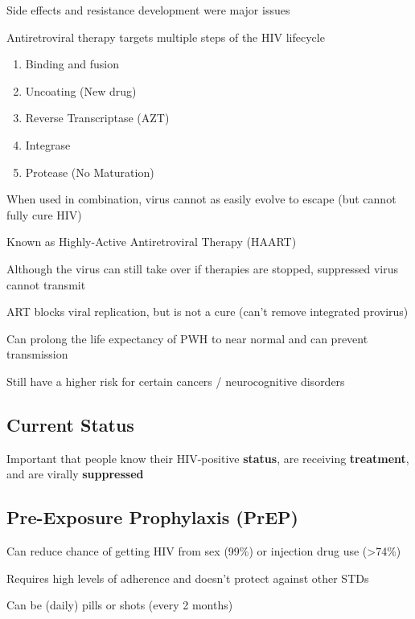 \documentclass{notes}
\begin{document}
\tab Side effects and resistance development were major issues

Antiretroviral therapy targets multiple steps of the HIV lifecycle

\begin{enumerate}
    \item Binding and fusion
    \item Uncoating (New drug)
    \item Reverse Transcriptase (AZT)
    \item Integrase
    \item Protease (No Maturation)
\end{enumerate}

When used in combination, virus cannot as easily evolve to escape (but cannot fully cure HIV)

\tab Known as Highly-Active Antiretroviral Therapy (HAART)


Although the virus can still take over if therapies are stopped, suppressed virus cannot transmit

ART blocks viral replication, but is not a cure (can't remove integrated provirus)

\tab Can prolong the life expectancy of PWH to near normal and can prevent transmission

\tab \indicates Still have a higher risk for certain cancers / neurocognitive disorders

\subsection{Current Status}

Important that people know their HIV-positive \textbf{status}, are receiving \textbf{treatment}, and are virally \textbf{suppressed}

\subsection{Pre-Exposure Prophylaxis (PrEP)}

Can reduce chance of getting HIV from sex (99\%) or injection drug use (\textgreater74\%)

\tab Requires high levels of adherence and doesn't protect against other STDs

Can be (daily) pills or shots (every 2 months)
\end{document}
